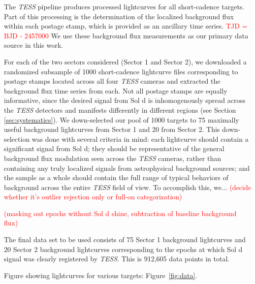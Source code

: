\documentclass[modern]{aastex62}
\newcommand{\TESS}{\emph{TESS}\xspace}
\newcommand{\todo}[1]{\textcolor{red}{#1}}
\begin{document}
The \TESS pipeline produces processed lightcurves for all short-cadence targets. 
Part of this processing is the determination of the localized background flux within each postage stamp, which is provided as an ancillary time series. 
\todo{TJD = BJD - 2457000}
We use these background flux measurements as our primary data source in this work. 

For each of the two sectors considered (Sector 1 and Sector 2), we downloaded a randomized subsample of 1000 short-cadence lightcurve files corresponding to postage stamps located across all four \TESS cameras and extracted the background flux time series from each. 
Not all postage stamps are equally informative, since the desired signal from Sol d is inhomogenously spread across the \TESS detectors and manifests differently in different regions (see Section \ref{sec:systematics}). 
We down-selected our pool of 1000 targets to 75 maximally useful background lightcurves from Sector 1 and 20 from Sector 2. 
This down-selection was done with several criteria in mind: each lightcurve should contain a significant signal from Sol d; they should be representative of the general background flux modulation seen across the \TESS cameras, rather than containing any truly localized signals from astrophysical background sources; and the sample as a whole should contain the full range of typical behaviors of background across the entire \TESS field of view. 
To accomplish this, we... \todo{(decide whether it's outlier rejection only or full-on categorization)}

\todo{(masking out epochs without Sol d shine, subtraction of baseline background flux)}

The final data set to be used consists of 75 Sector 1 background lightcurves and 20 Sector 2 background lightcurves corresponding to the epochs at which Sol d signal was clearly registered by \TESS. 
This is 912,605 data points in total.


Figure showing lightcurves for various targets: Figure~\ref{fig:data}.
\end{document}
